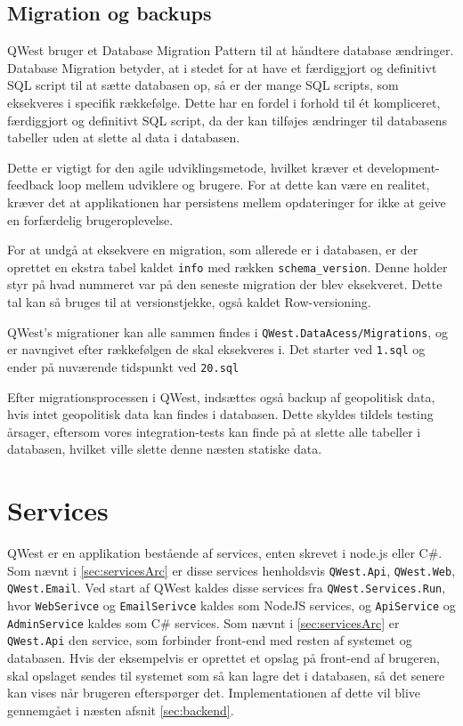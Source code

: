 \subsection{Migration og backups}\label{sec:migration}
QWest bruger et Database Migration Pattern\cite{datamigration} til at håndtere database ændringer.
Database Migration betyder, at i stedet for at have et færdiggjort og definitivt SQL script til at sætte databasen op, så er der mange SQL scripts, som eksekveres i specifik rækkefølge. Dette har en fordel i forhold til ét kompliceret, færdiggjort og definitivt SQL script, da der kan tilføjes ændringer til databasens tabeller uden at slette al data i databasen.

Dette er vigtigt for den agile udviklingsmetode, hvilket kræver et development-feedback loop mellem udviklere og brugere. For at dette kan være en realitet, kræver det at applikationen har persistens mellem opdateringer for ikke at geive en forfærdelig brugeroplevelse.

For at undgå at eksekvere en migration, som allerede er i databasen, er der oprettet en ekstra tabel kaldet \texttt{info} med rækken \texttt{schema\_version}. Denne holder styr på hvad nummeret var på den seneste migration der blev eksekveret. Dette tal kan så bruges til at versionstjekke, også kaldet Row-versioning\cite{rowversioning}.

QWest's migrationer kan alle sammen findes i \texttt{QWest.DataAcess/Migrations}, og er navngivet efter rækkefølgen de skal eksekveres i. Det starter ved \texttt{1.sql} og ender på nuværende tidspunkt ved \texttt{20.sql}

Efter migrationsprocessen i QWest, indsættes også backup af geopolitisk data, hvis intet geopolitisk data kan findes i databasen. Dette skyldes tildels testing årsager, eftersom vores integration-tests kan finde på at slette alle tabeller i databasen, hvilket ville slette denne næsten statiske data. 

\section{Services}\label{sec:servicesImp}
QWest er en applikation bestående af services, enten skrevet i node.js\cite{nodejs} eller C\#. Som nævnt i \ref{sec:servicesArc} er disse services henholdsvis \texttt{QWest.Api}, \texttt{QWest.Web}, \texttt{QWest.Email}.
Ved start af QWest kaldes disse services fra \texttt{QWest.Services.Run}, hvor \texttt{WebSerivce} og \texttt{EmailSerivce} kaldes som NodeJS services, og \texttt{ApiService} og \texttt{AdminService} kaldes som C\# services. 
Som nævnt i \ref{sec:servicesArc} er \texttt{QWest.Api} den service, som forbinder front-end med resten af systemet og databasen. Hvis der eksempelvis er oprettet et opslag på front-end af brugeren, skal opslaget sendes til systemet som så kan lagre det i databasen, så det senere kan vises når brugeren efterspørger det. Implementationen af dette vil blive gennemgået i næsten afsnit \ref{sec:backend}.

